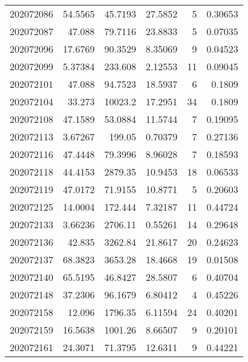 \begin{tabular}{rrrrrr}
 202072086 &         54.5565  &       45.7193 &           27.5852  &           5 & 0.30653 \\
 202072087 &         47.088   &       79.7116 &           23.8833  &           5 & 0.07035 \\
 202072096 &         17.6769  &       90.3529 &            8.35069 &           9 & 0.04523 \\
 202072099 &          5.37384 &      233.608  &            2.12553 &          11 & 0.09045 \\
 202072101 &         47.088   &       94.7523 &           18.5937  &           6 & 0.1809  \\
 202072104 &         33.273   &    10023.2    &           17.2951  &          34 & 0.1809  \\
 202072108 &         47.1589  &       53.0884 &           11.5744  &           7 & 0.19095 \\
 202072113 &          3.67267 &      199.05   &            0.70379 &           7 & 0.27136 \\
 202072116 &         47.4448  &       79.3996 &            8.96028 &           7 & 0.18593 \\
 202072118 &         44.4153  &     2879.35   &           10.9453  &          18 & 0.06533 \\
 202072119 &         47.0172  &       71.9155 &           10.8771  &           5 & 0.20603 \\
 202072125 &         14.0004  &      172.444  &            7.32187 &          11 & 0.44724 \\
 202072133 &          3.66236 &     2706.11   &            0.55261 &          14 & 0.29648 \\
 202072136 &         42.835   &     3262.84   &           21.8617  &          20 & 0.24623 \\
 202072137 &         68.3823  &     3653.28   &           18.4668  &          19 & 0.01508 \\
 202072140 &         65.5195  &       46.8427 &           28.5807  &           6 & 0.40704 \\
 202072148 &         37.2306  &       96.1679 &            6.80412 &           4 & 0.45226 \\
 202072158 &         12.096   &     1796.35   &            6.11594 &          24 & 0.40201 \\
 202072159 &         16.5638  &     1001.26   &            8.66507 &           9 & 0.20101 \\
 202072161 &         24.3071  &       71.3795 &           12.6311  &           9 & 0.44221 \\

\end{tabular}
